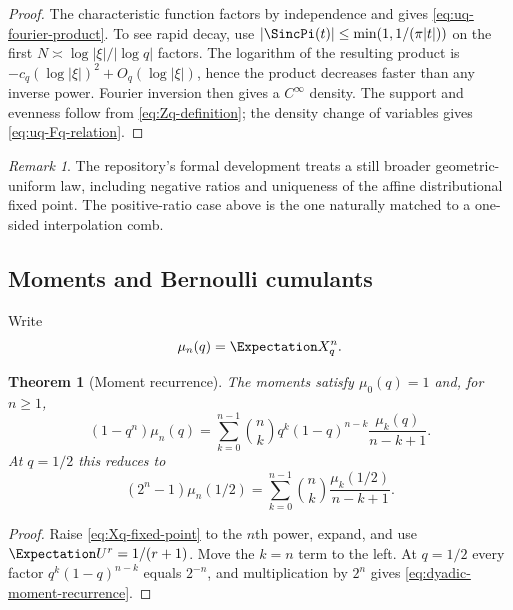 \documentclass[11pt,a4paper,oneside]{article}
\newtheorem{theorem}{Theorem}[section]
\theoremstyle{definition}
\theoremstyle{remark}
\newtheorem{remark}[remark]{Remark}
\begin{document}
\begin{proof}
The characteristic function factors by independence and gives
\eqref{eq:uq-fourier-product}.  To see rapid decay, use
$|\SincPi(t)|\le\min(1,1/(\pi|t|))$ on the first
$N\asymp\log|\xi|/|\log q|$ factors.  The logarithm of the resulting product
is $-c_q(\log|\xi|)^2+O_q(\log|\xi|)$, hence the product decreases faster than
any inverse power.  Fourier inversion then gives a $C^\infty$ density.  The
support and evenness follow from \eqref{eq:Zq-definition}; the density change
of variables gives \eqref{eq:uq-Fq-relation}.
\end{proof}

\begin{remark}
The repository's formal development treats a still broader geometric-uniform
law, including negative ratios and uniqueness of the affine distributional
fixed point.  The positive-ratio case above is the one naturally matched to a
one-sided interpolation comb.
\end{remark}

\subsection{Moments and Bernoulli cumulants}

Write
\begin{equation}
 \mu_n(q)=\Expectation X_q^n.
 \label{eq:muq-definition}
\end{equation}

\begin{theorem}[Moment recurrence]
\label{thm:moment-recurrence}
The moments satisfy $\mu_0(q)=1$ and, for $n\ge1$,
\begin{equation}
 (1-q^n)\mu_n(q)
 =\sum_{k=0}^{n-1}\binom nk
 q^k(1-q)^{n-k}\frac{\mu_k(q)}{n-k+1}.
 \label{eq:general-moment-recurrence}
\end{equation}
At $q=1/2$ this reduces to
\begin{equation}
 (2^n-1)\mu_n(1/2)
 =\sum_{k=0}^{n-1}\binom nk\frac{\mu_k(1/2)}{n-k+1}.
 \label{eq:dyadic-moment-recurrence}
\end{equation}
\end{theorem}

\begin{proof}
Raise \eqref{eq:Xq-fixed-point} to the $n$th power, expand, and use
$\Expectation U^r=1/(r+1)$.  Move the $k=n$ term to the left.  At $q=1/2$ every factor
$q^k(1-q)^{n-k}$ equals $2^{-n}$, and multiplication by $2^n$ gives
\eqref{eq:dyadic-moment-recurrence}.
\end{proof}
\end{document}
